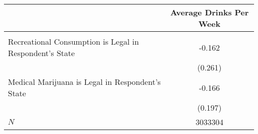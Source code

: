 \begin{tabular}{l*{1}{c}}
\hline\hline
            &\multicolumn{1}{c}{Average Drinks Per Week}\\
\hline
&            \\
Recreational Consumption is Legal in Respondent's State       &      -0.162\\
            &     (0.261)\\
[1em]
Medical Marijuana is Legal in Respondent's State         &      -0.166\\
            &     (0.197)\\
\hline
\(N\)       &     3033304\\
\hline\hline
\end{tabular}

